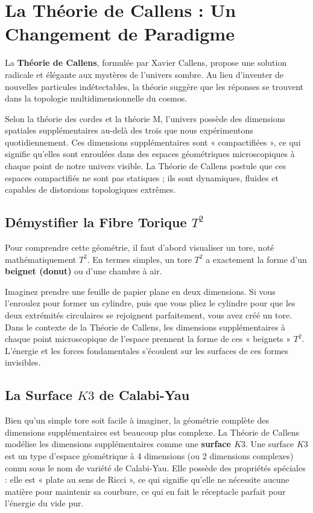 \documentclass[a4paper,12pt]{article}
\begin{document}
\section{La Théorie de Callens : Un Changement de Paradigme}
La \textbf{Théorie de Callens}, formulée par Xavier Callens, propose une solution radicale et élégante aux mystères de l'univers sombre. Au lieu d'inventer de nouvelles particules indétectables, la théorie suggère que les réponses se trouvent dans la topologie multidimensionnelle du cosmos.

Selon la théorie des cordes et la théorie M, l'univers possède des dimensions spatiales supplémentaires au-delà des trois que nous expérimentons quotidiennement. Ces dimensions supplémentaires sont « compactifiées », ce qui signifie qu'elles sont enroulées dans des espaces géométriques microscopiques à chaque point de notre univers visible. La Théorie de Callens postule que ces espaces compactifiés ne sont pas statiques ; ils sont dynamiques, fluides et capables de distorsions topologiques extrêmes.

\subsection{Démystifier la Fibre Torique $T^2$}
Pour comprendre cette géométrie, il faut d'abord visualiser un tore, noté mathématiquement $T^2$. En termes simples, un tore $T^2$ a exactement la forme d'un \textbf{beignet (donut)} ou d'une chambre à air.

Imaginez prendre une feuille de papier plane en deux dimensions. Si vous l'enroulez pour former un cylindre, puis que vous pliez le cylindre pour que les deux extrémités circulaires se rejoignent parfaitement, vous avez créé un tore. Dans le contexte de la Théorie de Callens, les dimensions supplémentaires à chaque point microscopique de l'espace prennent la forme de ces « beignets » $T^2$. L'énergie et les forces fondamentales s'écoulent sur les surfaces de ces formes invisibles.

\subsection{La Surface $K3$ de Calabi-Yau}
Bien qu'un simple tore soit facile à imaginer, la géométrie complète des dimensions supplémentaires est beaucoup plus complexe. La Théorie de Callens modélise les dimensions supplémentaires comme une \textbf{surface $K3$}. Une surface $K3$ est un type d'espace géométrique à 4 dimensions (ou 2 dimensions complexes) connu sous le nom de variété de Calabi-Yau. Elle possède des propriétés spéciales : elle est « plate au sens de Ricci », ce qui signifie qu'elle ne nécessite aucune matière pour maintenir sa courbure, ce qui en fait le réceptacle parfait pour l'énergie du vide pur.
\end{document}
